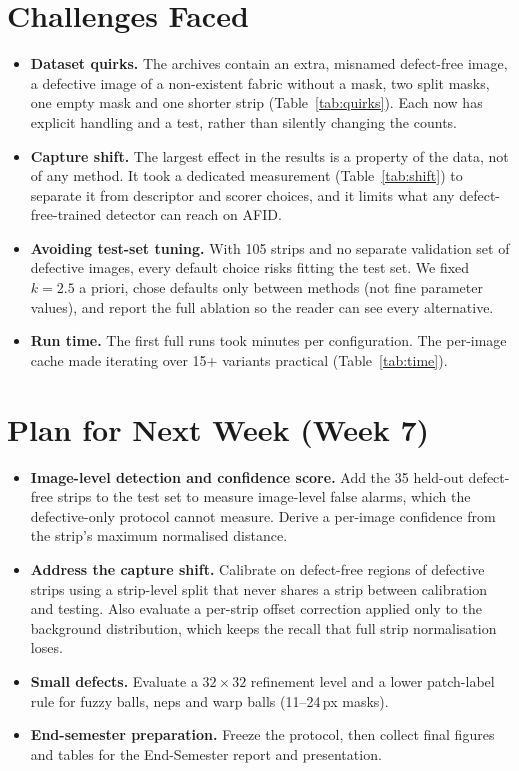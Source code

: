 \documentclass[11pt,a4paper]{article}
\begin{document}
\section*{Challenges Faced}
\begin{itemize}
  \item \textbf{Dataset quirks.} The archives contain an extra, misnamed defect-free image, a defective image of a non-existent fabric without a mask, two split masks, one empty mask and one shorter strip (Table~\ref{tab:quirks}). Each now has explicit handling and a test, rather than silently changing the counts.
  \item \textbf{Capture shift.} The largest effect in the results is a property of the data, not of any method. It took a dedicated measurement (Table~\ref{tab:shift}) to separate it from descriptor and scorer choices, and it limits what any defect-free-trained detector can reach on AFID.
  \item \textbf{Avoiding test-set tuning.} With 105 strips and no separate validation set of defective images, every default choice risks fitting the test set. We fixed $k=2.5$ a priori, chose defaults only between methods (not fine parameter values), and report the full ablation so the reader can see every alternative.
  \item \textbf{Run time.} The first full runs took minutes per configuration. The per-image cache made iterating over 15+ variants practical (Table~\ref{tab:time}).
\end{itemize}

\section*{Plan for Next Week (Week 7)}
\begin{itemize}
  \item \textbf{Image-level detection and confidence score.} Add the 35 held-out defect-free strips to the test set to measure image-level false alarms, which the defective-only protocol cannot measure. Derive a per-image confidence from the strip's maximum normalised distance.
  \item \textbf{Address the capture shift.} Calibrate on defect-free regions of defective strips using a strip-level split that never shares a strip between calibration and testing. Also evaluate a per-strip offset correction applied only to the background distribution, which keeps the recall that full strip normalisation loses.
  \item \textbf{Small defects.} Evaluate a $32\times32$ refinement level and a lower patch-label rule for fuzzy balls, neps and warp balls (11--24\,px masks).
  \item \textbf{End-semester preparation.} Freeze the protocol, then collect final figures and tables for the End-Semester report and presentation.
\end{itemize}
\end{document}
